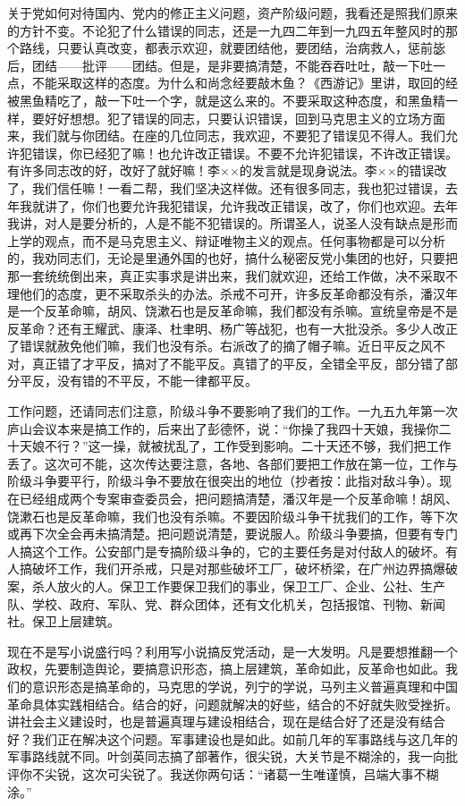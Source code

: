 关于党如何对待国内、党内的修正主义问题，资产阶级问题，我看还是照我们原来的方针不变。不论犯了什么错误的同志，还是一九四二年到一九四五年整风时的那个路线，只要认真改变，都表示欢迎，就要团结他，要团结，治病救人，惩前毖后，团结——批评——团结。但是，是非要搞清楚，不能吞吞吐吐，敲一下吐一点，不能采取这样的态度。为什么和尚念经要敲木鱼？《西游记》里讲，取回的经被黑鱼精吃了，敲一下吐一个字，就是这么来的。不要采取这种态度，和黑鱼精一样，要好好想想。犯了错误的同志，只要认识错误，回到马克思主义的立场方面来，我们就与你团结。在座的几位同志，我欢迎，不要犯了错误见不得人。我们允许犯错误，你已经犯了嘛！也允许改正错误。不要不允许犯错误，不许改正错误。有许多同志改的好，改好了就好嘛！李××的发言就是现身说法。李××的错误改了，我们信任嘛！一看二帮，我们坚决这样做。还有很多同志，我也犯过错误，去年我就讲了，你们也要允许我犯错误，允许我改正错误，改了，你们也欢迎。去年我讲，对人是要分析的，人是不能不犯错误的。所谓圣人，说圣人没有缺点是形而上学的观点，而不是马克思主义、辩证唯物主义的观点。任何事物都是可以分析的，我劝同志们，无论是里通外国的也好，搞什么秘密反党小集团的也好，只要把那一套统统倒出来，真正实事求是讲出来，我们就欢迎，还给工作做，决不采取不理他们的态度，更不采取杀头的办法。杀戒不可开，许多反革命都没有杀，潘汉年是一个反革命嘛，胡风、饶漱石也是反革命嘛，我们都没有杀嘛。宣统皇帝是不是反革命？还有王耀武、康泽、杜聿明、杨广等战犯，也有一大批没杀。多少人改正了错误就赦免他们嘛，我们也没有杀。右派改了的摘了帽子嘛。近日平反之风不对，真正错了才平反，搞对了不能平反。真错了的平反，全错全平反，部分错了部分平反，没有错的不平反，不能一律都平反。

工作问题，还请同志们注意，阶级斗争不要影响了我们的工作。一九五九年第一次庐山会议本来是搞工作的，后来出了彭德怀，说：“你操了我四十天娘，我操你二十天娘不行？”这一操，就被扰乱了，工作受到影响。二十天还不够，我们把工作丢了。这次可不能，这次传达要注意，各地、各部们要把工作放在第一位，工作与阶级斗争要平行，阶级斗争不要放在很突出的地位（抄者按：此指对敌斗争）。现在已经组成两个专案审查委员会，把问题搞清楚，潘汉年是一个反革命嘛！胡风、饶漱石也是反革命嘛，我们也没有杀嘛。不要因阶级斗争干扰我们的工作，等下次或再下次全会再未搞清楚。把问题说清楚，要说服人。阶级斗争要搞，但要有专门人搞这个工作。公安部门是专搞阶级斗争的，它的主要任务是对付敌人的破坏。有人搞破坏工作，我们开杀戒，只是对那些破坏工厂，破坏桥梁，在广州边界搞爆破案，杀人放火的人。保卫工作要保卫我们的事业，保卫工厂、企业、公社、生产队、学校、政府、军队、党、群众团体，还有文化机关，包括报馆、刊物、新闻社。保卫上层建筑。

现在不是写小说盛行吗？利用写小说搞反党活动，是一大发明。凡是要想推翻一个政权，先要制造舆论，要搞意识形态，搞上层建筑，革命如此，反革命也如此。我们的意识形态是搞革命的，马克思的学说，列宁的学说，马列主义普遍真理和中国革命具体实践相结合。结合的好，问题就解决的好些，结合的不好就失败受挫折。讲社会主义建设时，也是普遍真理与建设相结合，现在是结合好了还是没有结合好？我们正在解决这个问题。军事建设也是如此。如前几年的军事路线与这几年的军事路线就不同。叶剑英同志搞了部著作，很尖锐，大关节是不糊涂的，我一向批评你不尖锐，这次可尖锐了。我送你两句话：“诸葛一生唯谨慎，吕端大事不糊涂。”

